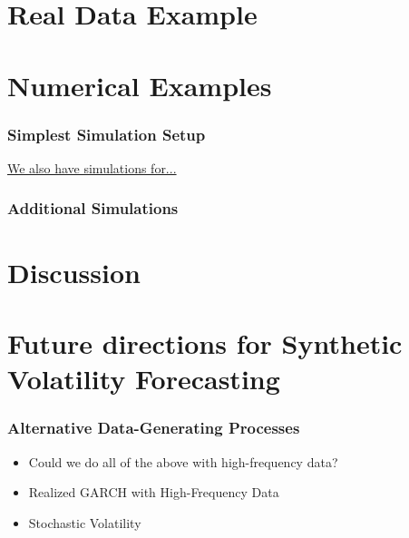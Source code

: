 \documentclass{beamer}
\theoremstyle{definition}
\begin{document}
\section{Real Data Example}

\section{Numerical Examples}

\begin{frame}
\fontsize{8pt}{9pt}

\frametitle{Simplest Simulation Setup}

\hyperlink{first_link_target}{We also have simulations for...}

\end{frame}

\begin{frame}
\frametitle{Additional Simulations}
\label{first_link_target}


\end{frame}

\section{Discussion}

\section{Future directions for Synthetic Volatility Forecasting}

\begin{frame}
\frametitle{Alternative Data-Generating Processes}
\begin{itemize}

\item{Could we do all of the above with high-frequency data?}

\item{Realized GARCH with High-Frequency Data}

\item{Stochastic Volatility}
\end{itemize}
\end{frame}
\end{document}
